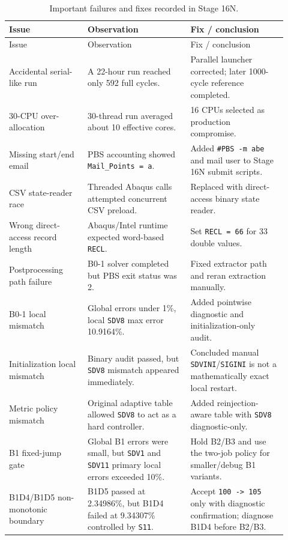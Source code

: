 \documentclass[11pt,a4paper]{article}
\newcommand{\code}[1]{\texttt{#1}}
\newcommand{\stage}{Stage 16N}
\begin{document}
\begin{longtable}{p{0.26\linewidth}p{0.34\linewidth}p{0.32\linewidth}}
\caption{Important failures and fixes recorded in \stage{}.}\\
\toprule
Issue & Observation & Fix / conclusion \\
\midrule
\endfirsthead
\toprule
Issue & Observation & Fix / conclusion \\
\midrule
\endhead
Accidental serial-like run & A 22-hour run reached only 592 full cycles. & Parallel launcher corrected; later 1000-cycle reference completed. \\
30-CPU over-allocation & 30-thread run averaged about 10 effective cores. & 16 CPUs selected as production compromise. \\
Missing start/end email & PBS accounting showed \code{Mail\_Points = a}. & Added \code{\#PBS -m abe} and mail user to Stage 16N submit scripts. \\
CSV state-reader race & Threaded Abaqus calls attempted concurrent CSV preload. & Replaced with direct-access binary state reader. \\
Wrong direct-access record length & Abaqus/Intel runtime expected word-based \code{RECL}. & Set \code{RECL = 66} for 33 double values. \\
Postprocessing path failure & B0-1 solver completed but PBS exit status was 2. & Fixed extractor path and reran extraction manually. \\
B0-1 local mismatch & Global errors under 1\%, local \code{SDV8} max error 10.9164\%. & Added pointwise diagnostic and initialization-only audit. \\
Initialization local mismatch & Binary audit passed, but \code{SDV8} mismatch appeared immediately. & Concluded manual \code{SDVINI}/\code{SIGINI} is not a mathematically exact local restart. \\
Metric policy mismatch & Original adaptive table allowed \code{SDV8} to act as a hard controller. & Added reinjection-aware table with \code{SDV8} diagnostic-only. \\
B1 fixed-jump gate & Global B1 errors were small, but \code{SDV1} and \code{SDV11} primary local errors exceeded 10\%. & Hold B2/B3 and use the two-job policy for smaller/debug B1 variants. \\
B1D4/B1D5 non-monotonic boundary & B1D5 passed at 2.34986\%, but B1D4 failed at 9.34307\% controlled by \code{S11}. & Accept \code{100 -> 105} only with diagnostic confirmation; diagnose B1D4 before B2/B3. \\

\end{longtable}
\end{document}
